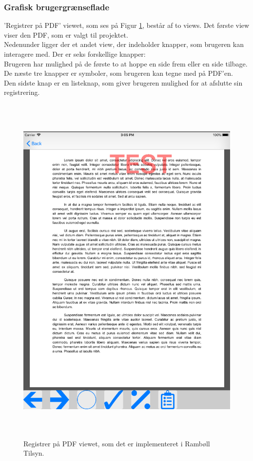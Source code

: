 \subsubsection{Grafisk brugergrænseflade}
'Registrer på PDF' viewet, som ses på Figur \ref{fig:RegistrerObjekterView}, består af to views. Det første view viser den PDF, som er valgt til projektet. \\
Nedenunder ligger der et andet view, der indeholder knapper, som brugeren kan interagere med. Der er seks forskellige knapper: \\
Brugeren har mulighed på de første to at hoppe en side frem eller en side tilbage. \\
De næste tre knapper er symboler, som brugeren kan tegne med på PDF'en. \\
Den sidste knap er en listeknap, som giver brugeren mulighed for at afslutte sin registrering.
\begin{figure}[H] %
	\centering
	\includegraphics[height=18cm, width=15cm]{../ArkitekturDesign/Design/RegisterPDF/PDF}
	\caption{Registrer på PDF viewet, som det er implementeret i Rambøll Tilsyn.}
	\label{fig:RegistrerObjekterView}
\end{figure}

